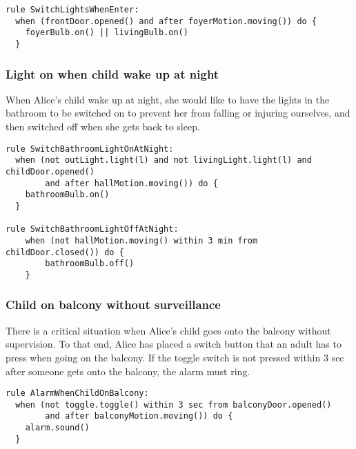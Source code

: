 \begin{lstlisting}[language=iotdsl]
rule SwitchLightsWhenEnter:
  when (frontDoor.opened() and after foyerMotion.moving()) do {
    foyerBulb.on() || livingBulb.on()
  }
\end{lstlisting}


\subsubsection*{Light on when child wake up at night}
	
When Alice's child wake up at night, she would like to have the lights in the bathroom to be switched on to prevent her from falling or injuring ourselves, and then switched off when she gets back to sleep.
	
\begin{lstlisting}[language=iotdsl]
rule SwitchBathroomLightOnAtNight:	
  when (not outLight.light(l) and not livingLight.light(l) and childDoor.opened() 
  		and after hallMotion.moving()) do {
  	bathroomBulb.on()
  }
  
rule SwitchBathroomLightOffAtNight:	
	when (not hallMotion.moving() within 3 min from childDoor.closed()) do {
		bathroomBulb.off()
	}
\end{lstlisting}
	
\subsubsection*{Child on balcony without surveillance}
	
There is a critical situation when Alice's child goes onto the balcony without supervision. To that end, Alice has placed a switch button that an adult has to press when going on the balcony. If the toggle switch is not pressed within 3 sec after someone gets onto the balcony, the alarm must ring.

\begin{lstlisting}[language=iotdsl]
rule AlarmWhenChildOnBalcony:	
  when (not toggle.toggle() within 3 sec from balconyDoor.opened() 
  		and after balconyMotion.moving()) do {
    alarm.sound()
  }
\end{lstlisting}




